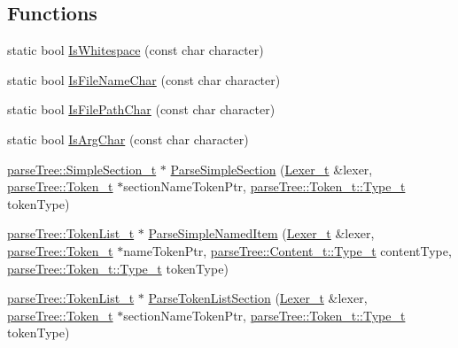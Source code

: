 \subsection*{Functions}
\begin{DoxyCompactItemize}
\item 
static bool \hyperlink{namespaceparser_af08109aadf5cf9b458bda7db47924f35}{Is\+Whitespace} (const char character)
\item 
static bool \hyperlink{namespaceparser_a40536379a768472357c80fae88e42767}{Is\+File\+Name\+Char} (const char character)
\item 
static bool \hyperlink{namespaceparser_a3f6a386e9ddd9e4310775efb747e6907}{Is\+File\+Path\+Char} (const char character)
\item 
static bool \hyperlink{namespaceparser_ad6fd41bac15729a81c345c988e014a74}{Is\+Arg\+Char} (const char character)
\item 
\hyperlink{structparse_tree_1_1_simple_section__t}{parse\+Tree\+::\+Simple\+Section\+\_\+t} $\ast$ \hyperlink{namespaceparser_a341557088d95a0a87d3ba9eb1da92deb}{Parse\+Simple\+Section} (\hyperlink{classparser_1_1_lexer__t}{Lexer\+\_\+t} \&lexer, \hyperlink{structparse_tree_1_1_token__t}{parse\+Tree\+::\+Token\+\_\+t} $\ast$section\+Name\+Token\+Ptr, \hyperlink{structparse_tree_1_1_token__t_ac0e6319a9ad80509dd4aa1037ba66096}{parse\+Tree\+::\+Token\+\_\+t\+::\+Type\+\_\+t} token\+Type)
\item 
\hyperlink{structparse_tree_1_1_token_list__t}{parse\+Tree\+::\+Token\+List\+\_\+t} $\ast$ \hyperlink{namespaceparser_adc9d11836c76512e57169a125f670a19}{Parse\+Simple\+Named\+Item} (\hyperlink{classparser_1_1_lexer__t}{Lexer\+\_\+t} \&lexer, \hyperlink{structparse_tree_1_1_token__t}{parse\+Tree\+::\+Token\+\_\+t} $\ast$name\+Token\+Ptr, \hyperlink{structparse_tree_1_1_content__t_a45cc4a193beac87a2045a2f6b6870d1b}{parse\+Tree\+::\+Content\+\_\+t\+::\+Type\+\_\+t} content\+Type, \hyperlink{structparse_tree_1_1_token__t_ac0e6319a9ad80509dd4aa1037ba66096}{parse\+Tree\+::\+Token\+\_\+t\+::\+Type\+\_\+t} token\+Type)
\item 
\hyperlink{structparse_tree_1_1_token_list__t}{parse\+Tree\+::\+Token\+List\+\_\+t} $\ast$ \hyperlink{namespaceparser_a27d34850c707bc913ed520c89ec25256}{Parse\+Token\+List\+Section} (\hyperlink{classparser_1_1_lexer__t}{Lexer\+\_\+t} \&lexer, \hyperlink{structparse_tree_1_1_token__t}{parse\+Tree\+::\+Token\+\_\+t} $\ast$section\+Name\+Token\+Ptr, \hyperlink{structparse_tree_1_1_token__t_ac0e6319a9ad80509dd4aa1037ba66096}{parse\+Tree\+::\+Token\+\_\+t\+::\+Type\+\_\+t} token\+Type)

\end{DoxyCompactItemize}
